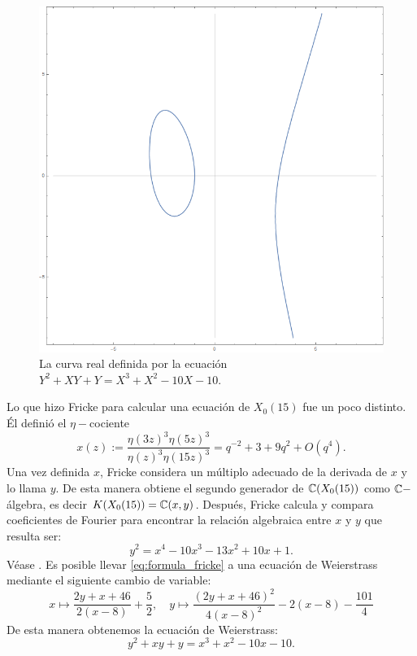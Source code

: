 \documentclass[../../tesis_maestria]{subfiles}
\begin{document}
\begin{figure}[!h]%
  \centering
  \includegraphics[scale=0.3]{figuras/eq_weierstrass}
  \caption{La curva real definida por la ecuación $Y^2+XY+Y=X^3+X^2-10X-10$.}
  \label{fig:eq_weierstrass}
\end{figure}%

\begin{nota}
Lo que hizo Fricke para calcular una ecuación de $X_0(15)$ fue un poco distinto. Él definió el $\eta-$cociente
\begin{equation}\label{eq:def_x_fricke}
	x(z):=
	\frac{\eta(3z)^3\eta(5z)^3}{\eta(z)^3\eta(15z)^3}=
	q^{-2}+3+9q^2+O(q^4).
\end{equation}
Una vez definida $x$, Fricke considera un múltiplo adecuado de la derivada de $x$ y lo llama $y$. De esta manera obtiene el segundo generador de $\mathbb{C}(X_0(15))$ como $\mathbb{C}-$álgebra, es decir $K(X_0(15))=\mathbb{C}(x,y)$. Después, Fricke calcula y compara coeficientes de Fourier para encontrar la relación algebraica entre $x$ y $y$ que resulta ser:
\begin{equation}\label{eq:formula_fricke}
		y^2=x^4-10x^3-13x^2+10x+1.
\end{equation}
Véase \cite[página 439]{Fricke}. Es posible llevar \eqref{eq:formula_fricke} a una ecuación de Weierstrass mediante el siguiente cambio de variable:
	\[
		x\mapsto \frac{2y+x+46}{2(x-8)}+\frac{5}{2},\quad
		y\mapsto \frac{(2y+x+46)^2}{4(x-8)^2}-2(x-8)-\frac{101}{4}
	\]
De esta manera obtenemos la ecuación de Weierstrass:
	\begin{equation}\label{eq:relacionweierstrass}
		y^2+xy+y=x^3+x^2-10x-10.
	\end{equation}
\end{nota}
\end{document}
